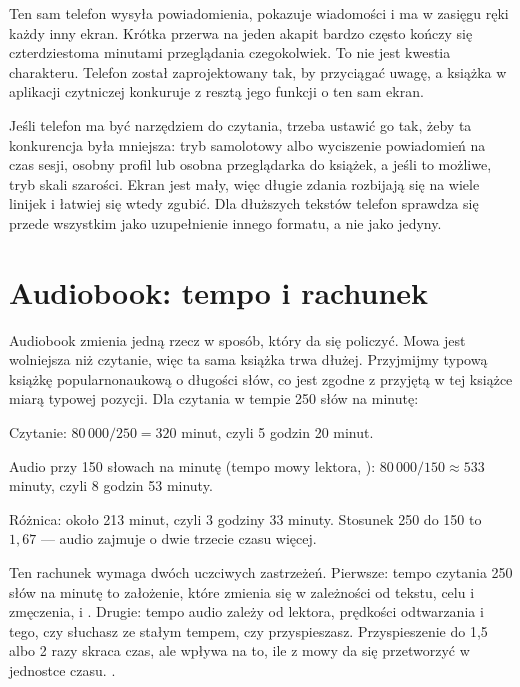 Ten sam telefon wysyła powiadomienia, pokazuje wiadomości i ma w zasięgu ręki każdy inny ekran. Krótka przerwa na jeden akapit bardzo często kończy się czterdziestoma minutami przeglądania czegokolwiek. To nie jest kwestia charakteru. Telefon został zaprojektowany tak, by przyciągać uwagę, a książka w aplikacji czytniczej konkuruje z resztą jego funkcji o ten sam ekran.

Jeśli telefon ma być narzędziem do czytania, trzeba ustawić go tak, żeby ta konkurencja była mniejsza: tryb samolotowy albo wyciszenie powiadomień na czas sesji, osobny profil lub osobna przeglądarka do książek, a jeśli to możliwe, tryb skali szarości. Ekran jest mały, więc długie zdania rozbijają się na wiele linijek i łatwiej się wtedy zgubić. Dla dłuższych tekstów telefon sprawdza się przede wszystkim jako uzupełnienie innego formatu, a nie jako jedyny.

\section{Audiobook: tempo i rachunek}

Audiobook zmienia jedną rzecz w sposób, który da się policzyć. Mowa jest wolniejsza niż czytanie, więc ta sama książka trwa dłużej. Przyjmijmy typową książkę popularnonaukową o długości  słów, co jest zgodne z przyjętą w tej książce miarą typowej pozycji. Dla czytania w tempie 250 słów na minutę:

\begin{przyklad}
  Czytanie: $80\,000 / 250 = 320$ minut, czyli 5 godzin 20 minut.

  Audio przy 150 słowach na minutę (tempo mowy lektora, ): $80\,000 / 150 \approx 533$ minuty, czyli 8 godzin 53 minuty.

  Różnica: około 213 minut, czyli 3 godziny 33 minuty. Stosunek 250 do 150 to $1{,}67$ --- audio zajmuje o dwie trzecie czasu więcej.
\end{przyklad}

Ten rachunek wymaga dwóch uczciwych zastrzeżeń. Pierwsze: tempo czytania 250 słów na minutę to założenie, które zmienia się w zależności od tekstu, celu i zmęczenia, i . Drugie: tempo audio zależy od lektora, prędkości odtwarzania i tego, czy słuchasz ze stałym tempem, czy przyspieszasz. Przyspieszenie do 1,5 albo 2 razy skraca czas, ale wpływa na to, ile z mowy da się przetworzyć w jednostce czasu. .

